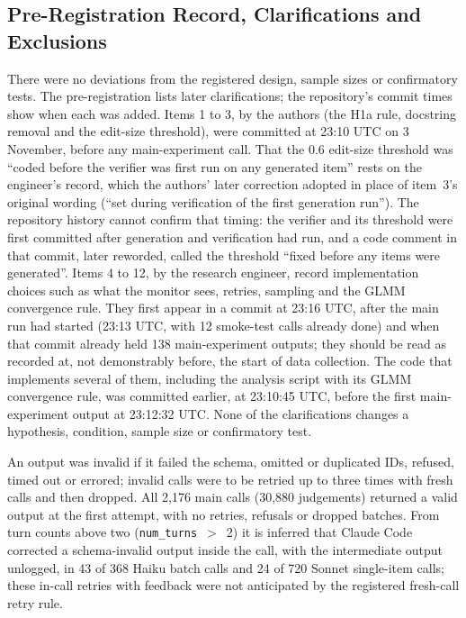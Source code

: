 \documentclass[letterpaper]{article} %
\newcommand{\code}[1]{\texttt{#1}}
\begin{document}
\subsection{Pre-Registration Record, Clarifications and Exclusions}

There were no deviations from the registered design, sample sizes or confirmatory tests. The pre-registration lists later clarifications; the repository's commit times show when each was added. Items 1 to 3, by the authors (the H1a rule, docstring removal and the edit-size threshold), were committed at 23:10 UTC on 3 November, before any main-experiment call. That the 0.6 edit-size threshold was ``coded before the verifier was first run on any generated item'' rests on the engineer's record, which the authors' later correction adopted in place of item~3's original wording (``set during verification of the first generation run''). The repository history cannot confirm that timing: the verifier and its threshold were first committed after generation and verification had run, and a code comment in that commit, later reworded, called the threshold ``fixed before any items were generated''. Items 4 to 12, by the research engineer, record implementation choices such as what the monitor sees, retries, sampling and the GLMM convergence rule. They first appear in a commit at 23:16 UTC, after the main run had started (23:13 UTC, with 12 smoke-test calls already done) and when that commit already held 138 main-experiment outputs; they should be read as recorded at, not demonstrably before, the start of data collection. The code that implements several of them, including the analysis script with its GLMM convergence rule, was committed earlier, at 23:10:45 UTC, before the first main-experiment output at 23:12:32 UTC. None of the clarifications changes a hypothesis, condition, sample size or confirmatory test.

An output was invalid if it failed the schema, omitted or duplicated IDs, refused, timed out or errored; invalid calls were to be retried up to three times with fresh calls and then dropped. All 2,176 main calls (30,880 judgements) returned a valid output at the first attempt, with no retries, refusals or dropped batches. From turn counts above two (\code{num\_turns}~$>$~2) it is inferred that Claude Code corrected a schema-invalid output inside the call, with the intermediate output unlogged, in 43 of 368 Haiku batch calls and 24 of 720 Sonnet single-item calls; these in-call retries with feedback were not anticipated by the registered fresh-call retry rule.
\end{document}
